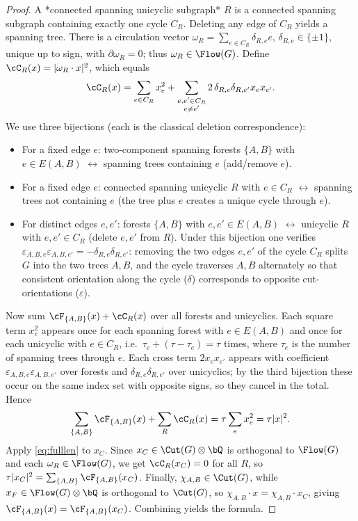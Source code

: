 \begin{proof}
A *connected spanning unicyclic subgraph* $R$ is a connected spanning subgraph
containing exactly one cycle $C_R$. Deleting any edge of $C_R$ yields a spanning
tree. There is a circulation vector $\omega_R=\sum_{e\in C_R}\delta_{R,e}e$,
$\delta_{R,e}\in\{\pm1\}$, unique up to sign, with $\partial\omega_R=0$; thus
$\omega_R\in\Flow(G)$. Define $\cC_R(x)=|\omega_R\cdot x|^2$, which equals
\[
\cC_R(x)=\sum_{e\in C_R}x_e^2+\sum_{\substack{e,e'\in C_R\\ e\neq e'}}2\,\delta_{R,e}\delta_{R,e'}x_e x_{e'}.
\]
We use three bijections (each is the classical deletion correspondence):
\begin{itemize}
\item For a fixed edge $e$: two-component spanning forests $\{A,B\}$ with
$e\in E(A,B)$ $\leftrightarrow$ spanning trees containing $e$ (add/remove $e$).
\item For a fixed edge $e$: connected spanning unicyclic $R$ with $e\in C_R$
$\leftrightarrow$ spanning trees not containing $e$ (the tree plus $e$ creates a
unique cycle through $e$).
\item For distinct edges $e,e'$: forests $\{A,B\}$ with $e,e'\in E(A,B)$
$\leftrightarrow$ unicyclic $R$ with $e,e'\in C_R$ (delete $e,e'$ from $R$).
Under this bijection one verifies
$\varepsilon_{A,B,e}\varepsilon_{A,B,e'}=-\delta_{R,e}\delta_{R,e'}$:
removing the two edges $e,e'$ of the cycle $C_R$ splits $G$ into the two trees
$A,B$, and the cycle traverses $A,B$ alternately so that consistent orientation
along the cycle ($\delta$) corresponds to opposite cut-orientations
($\varepsilon$).
\end{itemize}
Now sum $\cF_{\{A,B\}}(x)+\cC_R(x)$ over all forests and unicyclics. Each square
term $x_e^2$ appears once for each spanning forest with $e\in E(A,B)$ and once
for each unicyclic with $e\in C_R$, i.e.\ $\tau_e+(\tau-\tau_e)=\tau$ times,
where $\tau_e$ is the number of spanning trees through $e$. Each cross term
$2x_ex_{e'}$ appears with coefficient
$\varepsilon_{A,B,e}\varepsilon_{A,B,e'}$ over forests and
$\delta_{R,e}\delta_{R,e'}$ over unicyclics; by the third bijection these occur
on the same index set with opposite signs, so they cancel in the total. Hence
\begin{equation}\label{eq:fulllen}
\sum_{\{A,B\}}\cF_{\{A,B\}}(x)+\sum_R\cC_R(x)=\tau\sum_e x_e^2=\tau|x|^2.
\end{equation}
Apply \eqref{eq:fulllen} to $x_C$. Since $x_C\in\Cut(G)\otimes\bQ$ is orthogonal
to $\Flow(G)$ and each $\omega_R\in\Flow(G)$, we get $\cC_R(x_C)=0$ for all $R$,
so $\tau|x_C|^2=\sum_{\{A,B\}}\cF_{\{A,B\}}(x_C)$. Finally, $\chi_{A,B}\in
\Cut(G)$, while $x_F\in\Flow(G)\otimes\bQ$ is orthogonal to $\Cut(G)$, so
$\chi_{A,B}\cdot x=\chi_{A,B}\cdot x_C$, giving
$\cF_{\{A,B\}}(x)=\cF_{\{A,B\}}(x_C)$. Combining yields the formula.
\end{proof}

